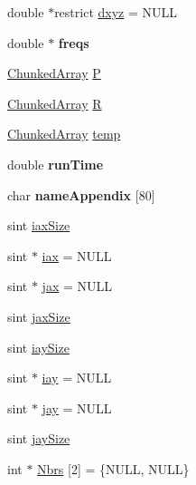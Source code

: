 \begin{DoxyCompactItemize}
double $\ast$restrict \mbox{\hyperlink{classPencilDcmp_aec821580237fce38c3bc110f3598aef7}{dxyz}} = N\+U\+LL
\item 
\mbox{\label{classPencilDcmp_a1ebc214b15b67cf4d63f227de95052d0}} 
double $\ast$ {\bfseries freqs}
\item 
\mbox{\hyperlink{classChunkedArray}{Chunked\+Array}} \mbox{\hyperlink{classPencilDcmp_a5e2f2da0cb460d3307c9f4a4429a7104}{P}}
\item 
\mbox{\hyperlink{classChunkedArray}{Chunked\+Array}} \mbox{\hyperlink{classPencilDcmp_a38a178b9176b286ceb4daa5e5a27df0f}{R}}
\item 
\mbox{\hyperlink{classChunkedArray}{Chunked\+Array}} \mbox{\hyperlink{classPencilDcmp_a229ec3f8be3816c1b7ffe2e7979fe542}{temp}}
\item 
\mbox{\label{classPencilDcmp_ac6a07f702b29754e48ac92671b3a8a86}} 
double {\bfseries run\+Time}
\item 
\mbox{\label{classPencilDcmp_ad253add14bcf5e941cad4e8e1d4e195b}} 
char {\bfseries name\+Appendix} \mbox{[}80\mbox{]}
\item 
sint \mbox{\hyperlink{classPencilDcmp_ab8ff65838fec412a74fb1f5178a413e6}{iax\+Size}}
\item 
sint $\ast$ \mbox{\hyperlink{classPencilDcmp_a212ba8f18dd586576806e271652b1ac1}{iax}} = N\+U\+LL
\item 
sint $\ast$ \mbox{\hyperlink{classPencilDcmp_ae7816023aee42122b16ab8a0d885b03f}{jax}} = N\+U\+LL
\item 
sint \mbox{\hyperlink{classPencilDcmp_abdef25617d6bf992f58e2d8676e42024}{jax\+Size}}
\item 
sint \mbox{\hyperlink{classPencilDcmp_a33d1d485a59cc727f9f4136d093874f2}{iay\+Size}}
\item 
sint $\ast$ \mbox{\hyperlink{classPencilDcmp_ab18c2646b8ccdaa7dc2db95ef4fc7bf3}{iay}} = N\+U\+LL
\item 
sint $\ast$ \mbox{\hyperlink{classPencilDcmp_a5f3b57ed2e3886b453b91dfdd3349f81}{jay}} = N\+U\+LL
\item 
sint \mbox{\hyperlink{classPencilDcmp_aeb810ab0904e334d8ea573fb5000d795}{jay\+Size}}
\item 
int $\ast$ \mbox{\hyperlink{classPencilDcmp_a88d5d59f2e15bc6a1e7b4370b757f8ce}{Nbrs}} \mbox{[}2\mbox{]} = \{N\+U\+LL, N\+U\+LL\}
\end{DoxyCompactItemize}
